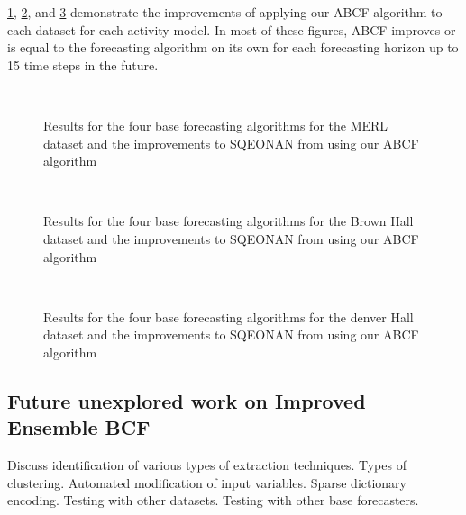 \ref{fig:sqe_merl_results}, \ref{fig:sqe_brown_results}, and \ref{fig:sqe_denver_results} demonstrate the improvements of applying our ABCF algorithm to each dataset for each activity model.  In most of these figures, ABCF improves or is equal to the forecasting algorithm on its own for each forecasting horizon up to 15 time steps in the future.

\begin{figure}[!t]
	\begin{center}
		 \\
	\end{center}
	\caption{Results for the four base forecasting algorithms for the MERL dataset and the improvements to SQEONAN from using our ABCF algorithm}
	\label{fig:sqe_merl_results}
\end{figure}

\begin{figure}[!t]
	\begin{center}
		 \\
	\end{center}
	\caption{Results for the four base forecasting algorithms for the Brown Hall dataset and the improvements to SQEONAN from using our ABCF algorithm}
	\label{fig:sqe_brown_results}
\end{figure}



\begin{figure}[!t]
	\begin{center}
		 \\
	\end{center}
	\caption{Results for the four base forecasting algorithms for the denver Hall dataset and the improvements to SQEONAN from using our ABCF algorithm}
	\label{fig:sqe_denver_results}
\end{figure}


\subsection{Future unexplored work on Improved Ensemble BCF}
Discuss identification of various types of extraction techniques.  Types of clustering.  Automated modification of input variables. Sparse dictionary encoding.  Testing with other datasets.  Testing with other base forecasters.

